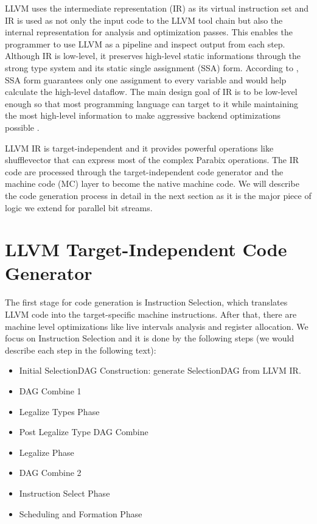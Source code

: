 LLVM uses the intermediate representation (IR) as its virtual instruction set and IR is used as not only the input code to the LLVM tool chain but also the internal representation for analysis and optimization passes. This enables the programmer to use LLVM as a pipeline and inspect output from each step. Although IR is low-level, it preserves high-level static informations through the strong type system and its static single assignment (SSA) form. According to \cite{cytron1991efficiently}, SSA form guarantees only one assignment to every variable and would help calculate the high-level dataflow. The main design goal of IR is to be low-level enough so that most programming language can target to it while maintaining the most high-level information to make aggressive backend optimizations possible \cite{llvm_ghc}.

LLVM IR is target-independent and it provides powerful operations like shufflevector that can express most of the complex Parabix operations. The IR code are processed through the target-independent code generator and the machine code (MC) layer to become the native machine code. We will describe the code generation process in detail in the next section as it is the major piece of logic we extend for parallel bit streams.

\section{LLVM Target-Independent Code Generator}
The first stage for code generation is Instruction Selection, which translates LLVM code into the target-specific machine instructions. After that, there are machine level optimizations like live intervals analysis and register allocation. We focus on Instruction Selection and it is done by the following steps \cite{llvm_code_gen} (we would describe each step in the following text):

\begin{itemize}
  \item Initial SelectionDAG Construction: generate SelectionDAG from LLVM IR.
  \item DAG Combine 1
  \item Legalize Types Phase
  \item Post Legalize Type DAG Combine
  \item Legalize Phase
  \item DAG Combine 2
  \item Instruction Select Phase
  \item Scheduling and Formation Phase
\end{itemize}

